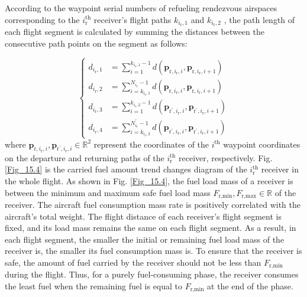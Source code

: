 According to the waypoint serial numbers of refueling rendezvous airspaces corresponding to the $i_{\text{r}}^{\text{th}}$  receiver's flight paths $k_{i_{\text{r}},1}$  and $k_{i_{\text{r}},2}$ , the path length of each flight segment is calculated by summing the distances between the consecutive path points on the segment as follows:

\begin{equation}
\left.\left\{\begin{aligned}d_{i_\text{r},1}&=\sum_{i=1}^{k_{i_\text{r},1}-1}d\left(\mathbf{p}_{\text{r},i_{\text{r}},i},\mathbf{p}_{\text{r},i_{\text{r}},i+1}\right)\\d_{i_\text{r},2}&=\sum_{i=k_{i_\text{r},1}}^{N_{i_\text{r}}-1}d\left(\mathbf{p}_{\text{r},i_{\text{r}},i},\mathbf{p}_{\text{r},i_{\text{r}},i+1}\right)\\d_{i_\text{r},3}&=\sum_{i=1}^{k_{i_\text{r},2}-1}d\left(\mathbf{p}_{\text{r}^{\prime},i_{\text{r}},i},\mathbf{p}_{\text{r}^{\prime},i_{\text{r}},i+1}\right)\\d_{i_\text{r},4}&=\sum_{i=k_{i_\text{r},2}}^{N_{i_\text{r}}^{\prime}-1}d\left(\mathbf{p}_{\text{r}^{\prime},i_{\text{r}},i},\mathbf{p}_{\text{r}^{\prime},i_{\text{r}},i+1}\right)\end{aligned}\right.\right.
\label{eq:15.13}
\end{equation}	 
where $\mathbf{p}_{\text{r},i_{\text{r}},i},\mathbf{p}_{\text{r}^{\prime},i_{\text{r}},i}\in\mathbb{R}^{2}$  represent the coordinates of the  $i_{}^{\text{th}}$  waypoint coordinates on the departure and returning paths of the $i_{\text{r}}^{\text{th}}$  receiver, respectively. Fig. \ref{Fig_15.4} is the carried fuel amount trend changes diagram of the   $i_{\text{r}}^{\text{th}}$ receiver in the whole flight. As shown in Fig. \ref{Fig_15.4}, the fuel load mass of a receiver is between the minimum and maximum safe fuel load mass $F_{\text{r,min}},F_{\text{r,max}}\in\mathbb{R}$  of the receiver. The aircraft fuel consumption mass rate is positively correlated with the aircraft's total weight. The flight distance of each receiver's flight segment is fixed, and its load mass remains the same on each flight segment. As a result, in each flight segment, the smaller the initial or remaining fuel load mass of the receiver is, the smaller its fuel consumption mass is. To ensure that the receiver is safe, the amount of fuel carried by the receiver should not be less than $F_{\text{r,min}}$  during the flight. Thus, for a purely fuel-consuming phase, the receiver consumes the least fuel when the remaining fuel is equal to $F_{\text{r,min}}$  at the end of the phase.

